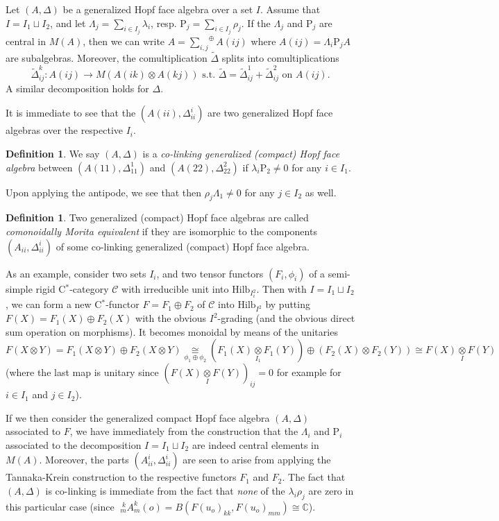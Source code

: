 \documentclass[12pt]{article}
\theoremstyle{change}
\newcommand{\C}{\mathbb{C}}
\newcommand{\CatC}{\mathcal{C}}
\newcommand{\Hilb}{\mathrm{Hilb}}
\newcommand{\Gr}[5]{\;{}^{\;#2}_{#4}#1_{#5}^{#3}}%
\newcommand{\iitimes}{\underset{I}{\otimes}}
\newcommand{\osum}[1]{\underset{#1}{\sum}^{\oplus}}
\newcommand{\wDelta}{\widetilde{\Delta}}
\newcommand{\Rho}{\mathrm{P}}
\theoremstyle{definition}
\newtheorem{Def}[Theorem]{Definition}
\numberwithin{equation}{section}
\begin{document}
Let $(A,\Delta)$ be a generalized Hopf face algebra over a set $I$. Assume that $I = I_1\sqcup I_2$, and let $\Lambda_j = \sum_{i\in I_j}\lambda_i$, resp. $\Rho_j = \sum_{i\in I_j} \rho_j$. If the $\Lambda_j$ and $\Rho_j$ are central in $M(A)$, then we can write $A = \osum{i,j} A(ij)$ where $A(ij) = \Lambda_i\Rho_jA$ are subalgebras. Moreover, the comultiplication $\wDelta$ splits into comultiplications \[\wDelta_{ij}^k:A(ij)\rightarrow M(A(ik)\otimes A(kj))\textrm{ s.t. } \wDelta = \wDelta_{ij}^1 +\wDelta_{ij}^2 \textrm{ on }A(ij).\] A similar decomposition holds for $\Delta$.

It is immediate to see that the $(A(ii),\Delta_{ii}^i)$ are two generalized Hopf face algebras over the respective $I_i$.

\begin{Def} We say $(A,\Delta)$ is a \emph{co-linking generalized (compact) Hopf face algebra} between $(A(11),\Delta_{11}^1)$ and $(A(22),\Delta_{22}^2)$ if $\lambda_i\Rho_2\neq 0$ for any $i\in I_1$.
\end{Def}

Upon applying the antipode, we see that then $\rho_j\Lambda_1\neq 0$ for any $j\in I_2$ as well.

\begin{Def} Two generalized (compact) Hopf face algebras are called \emph{comonoidally Morita equivalent} if they are isomorphic to the components $(A_{ii},\Delta_{ii}^i)$ of some co-linking generalized (compact) Hopf face algebra.\end{Def}

As an example, consider two sets $I_i$, and two tensor functors $(F_i,\phi_i)$ of a semi-simple rigid C$^*$-category $\CatC$ with irreducible unit into $\Hilb_{I_i^2}$. Then with $I= I_1\sqcup I_2$, we can form a new C$^*$-functor $F=F_1\oplus F_2$ of $\CatC$ into $\Hilb_{I^2}$ by putting $F(X) = F_1(X)\oplus F_2(X)$ with the obvious $I^2$-grading (and the obvious direct sum operation on morphisms). It becomes monoidal by means of the unitaries \[F(X\otimes Y) = F_1(X\otimes Y)\oplus F_2(X\otimes Y) \underset{\phi_1\oplus \phi_2}{\cong} (F_1(X)\underset{I_1}{\otimes} F_1(Y)) \oplus (F_2(X)\otimes F_2(Y)) \cong F(X)\iitimes F(Y)\] (where the last map is unitary since $(F(X)\iitimes F(Y))_{ij}=0$ for example for $i\in I_1$ and $j\in I_2$).

If we then consider the generalized compact Hopf face algebra $(A,\Delta)$ associated to $F$, we have immediately from the construction that the $\Lambda_i$ and $\Rho_i$ associated to the decomposition $I = I_1\sqcup I_2$ are indeed central elements in $M(A)$. Moreover, the parts $(A_{ii}^i,\Delta_{ii}^i)$ are seen to arise from applying the Tannaka-Krein construction to the respective functors $F_1$ and $F_2$. The fact that $(A,\Delta)$ is co-linking is immediate from the fact that \emph{none} of the $\lambda_i\rho_j$ are zero in this particular case (since $\Gr{A}{k}{k}{m}{m}(o) = B(F(u_o)_{kk},F(u_o)_{mm}) \cong \C$).
\end{document}
